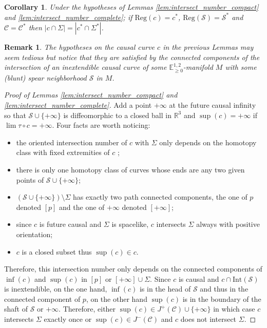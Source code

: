 \documentclass[a4paper,12pt]{article}
\def\C{\mathcal C}
\def\S{\mathcal S}
\def\S{\mathcal{S}}
\def\RR{\mathbb{R}}
\newcommand{\mass}[1]{{\mathbb E}^{1,2}_{#1}}
\def\Reg{\mathrm{Reg}}
\def\reg{\Reg}
\newtheorem{corou}[lemou]{Corollary}
\newtheorem{remark}{Remark}             %
\begin{document}
    \begin{corou}\label{cor:intersect} Under the hypotheses of Lemmas \ref{lem:intersect_number_compact} and \ref{lem:intersect_number_complete}; if $\reg(c)=c^*$, $\reg(\S)=\S^*$ and $\C=\C^*$
    then $|c\cap \Sigma| = |c^*\cap\Sigma^*|$.
    \end{corou}
 \begin{remark}\label{rem:curve_spear} The hypotheses on the causal curve $c$ in the previous Lemmas may seem tedious but notice that they are satisfied by the connected components of the intersection of an inextendible causal curve of some $\mass{\geq0}$-manifold $M$ with some (blunt) spear neighborhood $\S$ in $M$. 
    \end{remark}
    \begin{proof}[Proof of Lemmas \ref{lem:intersect_number_compact} and \ref{lem:intersect_number_complete}]
     Add a point $+\infty$ at the future causal infinity so that $\S\cup\{+\infty\}$ is diffeomorphic to a closed ball in $\RR^3$ and $\sup(c)=+\infty$ if $\lim\tau\circ c = +\infty$. Four facts are worth noticing: 
     \begin{itemize}
      \item the oriented intersection number of $c$ with $\Sigma$ only depends on the homotopy class with fixed extremities of $c$ \cite{MR2680546};
      \item there is only one homotopy class of curves whose ends are any two given points of $\S\cup \{+\infty\}$; 
      \item $(\S\cup\{+\infty\})\setminus\Sigma$ has exactly two path connected components, the one of $p$ denoted $[p]$ and the one of $+\infty$ denoted $[+\infty]$;
      \item since $c$ is future causal and $\Sigma$ is spacelike, $c$ intersects $\Sigma$  always with positive orientation;
      \item $c$ is a closed subset thus $\sup(c)\in c$.
     \end{itemize}
      Therefore, this intersection number only depends on the connected components of $\inf(c)$ and $\sup(c)$ in $[p]$ or $[+\infty]\cup\Sigma$. Since $c$ is causal and $c\cap \mathrm{Int}(\S)$ is inextendible, on the one hand, $\inf(c)$ is in the head of $\S$ and thus in the connected component of $p$, on the other hand $\sup(c)$ is in the boundary of the shaft of $\S$ or $+\infty$. Therefore, either $\sup(c)\in J^+(\C)\cup\{+\infty\}$ in which case $c$ intersects $\Sigma$ exactly once or $\sup(c)\in J^-(\C)$ and  $c$ does not intersect $\Sigma$.
      

\end{proof}
\end{document}
